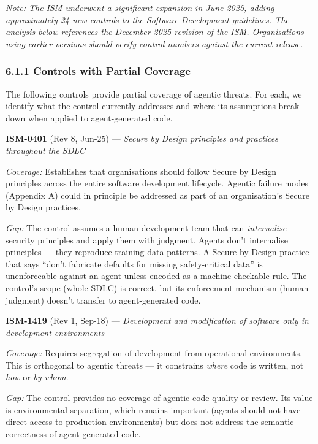 \documentclass[a4paper,11pt]{report}
\begin{document}
\emph{Note: The ISM underwent a significant expansion in June 2025,
adding approximately 24 new controls to the Software Development
guidelines. The analysis below references the December 2025 revision of
the ISM. Organisations using earlier versions should verify control
numbers against the current release.}

\hypertarget{controls-with-partial-coverage}{%
\subsubsection{6.1.1 Controls with Partial
Coverage}\label{controls-with-partial-coverage}}

The following controls provide partial coverage of agentic threats. For
each, we identify what the control currently addresses and where its
assumptions break down when applied to agent-generated code.

\textbf{ISM-0401} (Rev 8, Jun-25) --- \emph{Secure by Design principles
and practices throughout the SDLC}

\emph{Coverage:} Establishes that organisations should follow Secure by
Design principles across the entire software development lifecycle.
Agentic failure modes (Appendix A) could in principle be addressed as
part of an organisation's Secure by Design practices.

\emph{Gap:} The control assumes a human development team that can
\emph{internalise} security principles and apply them with judgment.
Agents don't internalise principles --- they reproduce training data
patterns. A Secure by Design practice that says ``don't fabricate
defaults for missing safety-critical data'' is unenforceable against an
agent unless encoded as a machine-checkable rule. The control's scope
(whole SDLC) is correct, but its enforcement mechanism (human judgment)
doesn't transfer to agent-generated code.

\textbf{ISM-1419} (Rev 1, Sep-18) --- \emph{Development and modification
of software only in development environments}

\emph{Coverage:} Requires segregation of development from operational
environments. This is orthogonal to agentic threats --- it constrains
\emph{where} code is written, not \emph{how} or \emph{by whom}.

\emph{Gap:} The control provides no coverage of agentic code quality or
review. Its value is environmental separation, which remains important
(agents should not have direct access to production environments) but
does not address the semantic correctness of agent-generated code.
\end{document}
